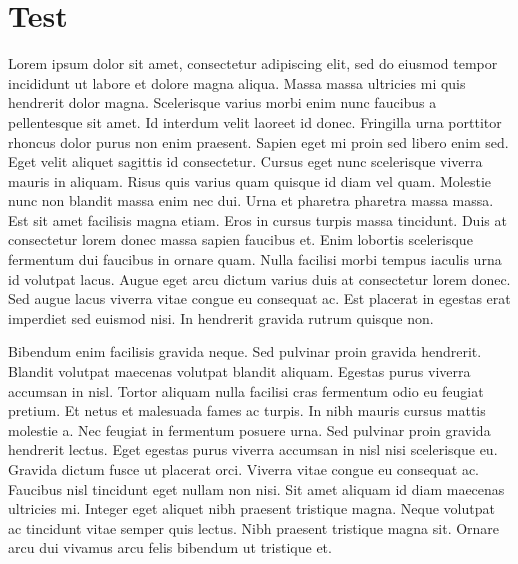 \documentclass[11pt,a4paper,openright,twoside,onecolumn]{memoir}
\let \oldsection \section
\renewcommand{\section}[2][]{
  \FloatBarrier
  \oldsection#1{#2}
}
\begin{document}

\mainmatter

\OnehalfSpacing


%
%
%
%

\section{Test}

Lorem ipsum dolor sit amet, consectetur adipiscing elit, sed do eiusmod
tempor incididunt ut labore et dolore magna aliqua. Massa massa
ultricies mi quis hendrerit dolor magna. Scelerisque varius morbi enim
nunc faucibus a pellentesque sit amet. Id interdum velit laoreet id
donec. Fringilla urna porttitor rhoncus dolor purus non enim praesent.
Sapien eget mi proin sed libero enim sed. Eget velit aliquet sagittis id
consectetur. Cursus eget nunc scelerisque viverra mauris in aliquam.
Risus quis varius quam quisque id diam vel quam. Molestie nunc non
blandit massa enim nec dui. Urna et pharetra pharetra massa massa. Est
sit amet facilisis magna etiam. Eros in cursus turpis massa tincidunt.
Duis at consectetur lorem donec massa sapien faucibus et. Enim lobortis
scelerisque fermentum dui faucibus in ornare quam. Nulla facilisi morbi
tempus iaculis urna id volutpat lacus. Augue eget arcu dictum varius
duis at consectetur lorem donec. Sed augue lacus viverra vitae congue eu
consequat ac. Est placerat in egestas erat imperdiet sed euismod nisi.
In hendrerit gravida rutrum quisque non.

Bibendum enim facilisis gravida neque. Sed pulvinar proin gravida
hendrerit. Blandit volutpat maecenas volutpat blandit aliquam. Egestas
purus viverra accumsan in nisl. Tortor aliquam nulla facilisi cras
fermentum odio eu feugiat pretium. Et netus et malesuada fames ac
turpis. In nibh mauris cursus mattis molestie a. Nec feugiat in
fermentum posuere urna. Sed pulvinar proin gravida hendrerit lectus.
Eget egestas purus viverra accumsan in nisl nisi scelerisque eu. Gravida
dictum fusce ut placerat orci. Viverra vitae congue eu consequat ac.
Faucibus nisl tincidunt eget nullam non nisi. Sit amet aliquam id diam
maecenas ultricies mi. Integer eget aliquet nibh praesent tristique
magna. Neque volutpat ac tincidunt vitae semper quis lectus. Nibh
praesent tristique magna sit. Ornare arcu dui vivamus arcu felis
bibendum ut tristique et.
\end{document}
